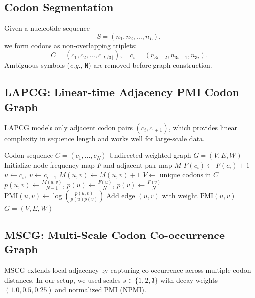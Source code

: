 \documentclass[conference]{IEEEtran}
\begin{document}
\subsection{Codon Segmentation}
Given a nucleotide sequence
\[
S = (n_1, n_2, \dots, n_L),
\]
we form codons as non-overlapping triplets:
\[
C = (c_1, c_2, \dots, c_{\lfloor L/3 \rfloor}), \quad
c_i = (n_{3i-2}, n_{3i-1}, n_{3i}).
\]
Ambiguous symbols (\textit{e.g.}, \texttt{N}) are removed before graph construction.

\subsection{LAPCG: Linear-time Adjacency PMI Codon Graph}
LAPCG models only adjacent codon pairs $(c_i, c_{i+1})$, which provides linear complexity in sequence length and works well for large-scale data.

\begin{algorithm}[t]
\caption{LAPCG Graph Construction}
\label{alg:lapcg}
\begin{algorithmic}[1]
\REQUIRE Codon sequence $C=(c_1,\dots,c_N)$
\ENSURE Undirected weighted graph $G=(V,E,W)$
\STATE Initialize node-frequency map $F$ and adjacent-pair map $M$
    \STATE $F(c_i) \leftarrow F(c_i)+1$
\ENDFOR
{}
    \STATE $u \leftarrow c_i,\; v \leftarrow c_{i+1}$
    \STATE $M(u,v) \leftarrow M(u,v)+1$ 
\ENDFOR
\STATE $V \leftarrow$ unique codons in $C$
    \STATE $p(u,v)\leftarrow \frac{M(u,v)}{N-1}$,\;\;
           $p(u)\leftarrow \frac{F(u)}{N}$,\;\;
           $p(v)\leftarrow \frac{F(v)}{N}$
    \STATE $\mathrm{PMI}(u,v)\leftarrow \log\!\left(\frac{p(u,v)}{p(u)p(v)}\right)$
        \STATE Add edge $(u,v)$ with weight $\mathrm{PMI}(u,v)$
    \ENDIF
\ENDFOR
\RETURN $G=(V,E,W)$
\end{algorithmic}
\end{algorithm}

\subsection{MSCG: Multi-Scale Codon Co-occurrence Graph}
MSCG extends local adjacency by capturing co-occurrence across multiple codon distances. In our setup, we used scales $s \in \{1,2,3\}$ with decay weights $(1.0,0.5,0.25)$ and normalized PMI (NPMI).
\end{document}
